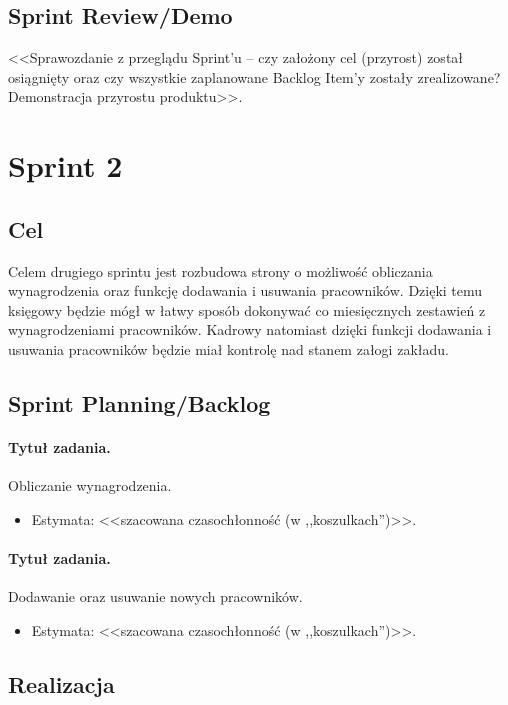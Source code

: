 \documentclass[a4paper]{article}
\begin{document}
\subsection{Sprint Review/Demo}
<<Sprawozdanie z przeglądu Sprint'u -- czy założony cel (przyrost) został osiągnięty oraz czy wszystkie zaplanowane Backlog Item'y zostały zrealizowane? Demonstracja przyrostu produktu>>.

\section{Sprint 2}

\subsection{Cel} Celem drugiego sprintu jest rozbudowa strony o możliwość obliczania wynagrodzenia oraz funkcję dodawania i usuwania pracowników. Dzięki temu księgowy będzie mógł w łatwy sposób dokonywać co miesięcznych zestawień z wynagrodzeniami pracowników. Kadrowy natomiast dzięki funkcji dodawania i usuwania pracowników będzie miał kontrolę nad stanem załogi zakładu.

\subsection{Sprint Planning/Backlog}

\paragraph{Tytuł zadania.} Obliczanie wynagrodzenia.
\begin{itemize}
\item Estymata: <<szacowana czasochłonność (w ,,koszulkach'')>>.
\end{itemize}

\paragraph{Tytuł zadania.} Dodawanie oraz usuwanie nowych pracowników.
\begin{itemize}
\item Estymata: <<szacowana czasochłonność (w ,,koszulkach'')>>.
\end{itemize}

\subsection{Realizacja}
\end{document}
